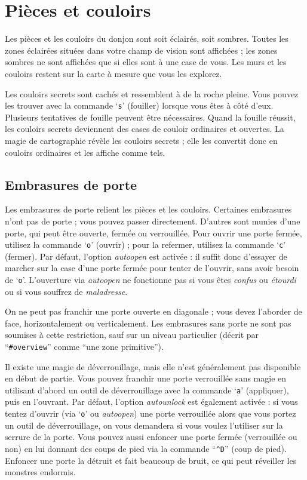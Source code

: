 \documentclass[titlepage]{article}
\begin{document}

\section{Pièces et couloirs}

Les pièces et les couloirs du donjon sont soit éclairés, soit sombres.
Toutes les zones éclairées situées dans votre champ de vision sont affichées ;
les zones sombres ne sont affichées que si elles sont à une case de vous.
Les murs et les couloirs restent sur la carte à mesure que vous les explorez.

Les couloirs secrets sont cachés et ressemblent à de la roche pleine.
Vous pouvez les trouver avec la commande `\texttt{s}' (fouiller) lorsque vous
êtes à côté d'eux.
Plusieurs tentatives de fouille peuvent être nécessaires.
Quand la fouille réussit, les couloirs secrets deviennent des cases de
couloir ordinaires et ouvertes.
La magie de cartographie révèle les couloirs secrets ; elle les convertit donc
en couloirs ordinaires et les affiche comme tels.

\subsection*{Embrasures de porte}

Les embrasures de porte relient les pièces et les couloirs.
Certaines embrasures n'ont pas de porte ; vous pouvez passer directement.
D'autres sont munies d'une porte, qui peut être ouverte, fermée ou verrouillée.
Pour ouvrir une porte fermée, utilisez la commande `\texttt{o}' (ouvrir) ;
pour la refermer, utilisez la commande `\texttt{c}' (fermer).
Par défaut, l'option
\textit{autoopen}
est activée : il suffit donc d'essayer de marcher sur la case d'une porte
fermée pour tenter de l'ouvrir, sans avoir besoin de `\texttt{o}'.
L'ouverture via
\textit{autoopen}
ne fonctionne pas si vous êtes \textit{confus} ou \textit{étourdi} ou si vous souffrez
de \textit{maladresse}.

On ne peut pas franchir une porte ouverte en diagonale ; vous devez l'aborder
de face, horizontalement ou verticalement.
Les embrasures sans porte ne sont
pas soumises à cette restriction, sauf sur un niveau particulier
(décrit par ``\texttt{\#overview}'' comme ``une zone primitive'').

Il existe une magie de déverrouillage, mais elle n'est généralement pas
disponible en début de partie.
Vous pouvez franchir une porte verrouillée sans magie en utilisant d'abord
un outil de déverrouillage avec la commande `\texttt{a}' (appliquer), puis en l'ouvrant.
Par défaut, l'option
\textit{autounlock}
est également activée : si vous tentez d'ouvrir (via `\texttt{o}' ou
\textit{autoopen})
une porte verrouillée alors que vous portez un outil de déverrouillage, on vous
demandera si vous voulez l'utiliser sur la serrure de la porte.
Vous pouvez aussi enfoncer une porte fermée (verrouillée ou non)
en lui donnant des coups de pied via la commande ``\texttt{\textasciicircum D}'' (coup de pied).
Enfoncer une porte la détruit et fait beaucoup de bruit, ce qui peut
réveiller les monstres endormis.
\end{document}
